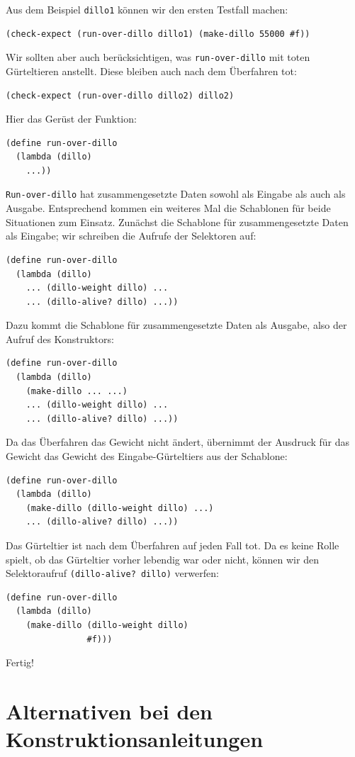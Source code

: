 %
Aus dem Beispiel \lstinline{dillo1} können wir den ersten Testfall machen:
%
\begin{lstlisting}
(check-expect (run-over-dillo dillo1) (make-dillo 55000 #f))
\end{lstlisting}
%
Wir sollten aber auch berücksichtigen, was \lstinline{run-over-dillo} mit
toten Gürteltieren anstellt.  Diese bleiben auch nach dem Überfahren
tot:
%
\begin{lstlisting}
(check-expect (run-over-dillo dillo2) dillo2)
\end{lstlisting}
%
Hier das Gerüst der Funktion:
%
\begin{lstlisting}
(define run-over-dillo
  (lambda (dillo)
    ...))
\end{lstlisting}
%
\lstinline{Run-over-dillo} hat zusammengesetzte Daten sowohl als Eingabe
als auch als Ausgabe.  Entsprechend kommen ein weiteres Mal die
Schablonen für beide Situationen zum Einsatz.  Zunächst die Schablone
für zusammengesetzte Daten als Eingabe; wir schreiben die Aufrufe der
Selektoren auf:
%
\begin{lstlisting}
(define run-over-dillo
  (lambda (dillo)
    ... (dillo-weight dillo) ...
    ... (dillo-alive? dillo) ...))
\end{lstlisting}
%
Dazu kommt die Schablone für zusammengesetzte Daten als Ausgabe, also
der Aufruf des Konstruktors:
%
\begin{lstlisting}
(define run-over-dillo
  (lambda (dillo)
    (make-dillo ... ...)
    ... (dillo-weight dillo) ...
    ... (dillo-alive? dillo) ...))
\end{lstlisting}
%
Da das Überfahren das Gewicht nicht ändert, übernimmt
der Ausdruck für das Gewicht das Gewicht des Eingabe-Gürteltiers aus
der Schablone:
%
\begin{lstlisting}
(define run-over-dillo
  (lambda (dillo)
    (make-dillo (dillo-weight dillo) ...)
    ... (dillo-alive? dillo) ...))
\end{lstlisting}
%
Das Gürteltier ist nach dem Überfahren auf jeden Fall tot.  Da es
keine Rolle spielt, ob das Gürteltier vorher lebendig war oder nicht,
können wir den Selektoraufruf \lstinline{(dillo-alive? dillo)} verwerfen:
%
\begin{lstlisting}
(define run-over-dillo
  (lambda (dillo)
    (make-dillo (dillo-weight dillo)
                #f)))
\end{lstlisting}
%
Fertig!

\section{Alternativen bei den Konstruktionsanleitungen}

